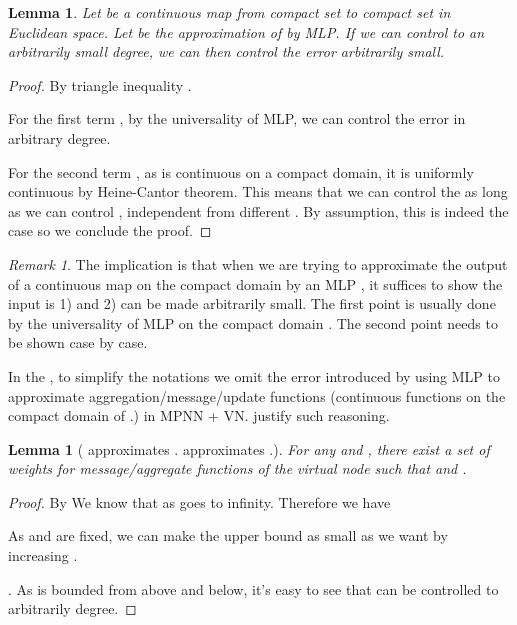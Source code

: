\documentclass[nohyperref]{article}
\theoremstyle{plain}
\newtheorem{lemma}[theorem]{Lemma}
\theoremstyle{definition}
\theoremstyle{remark}
\newtheorem{remark}[theorem]{Remark}
\begin{document}
\begin{lemma}
\label{lemma:approximation-meta-lemma}
Let  be a continuous map from compact set to compact set in Euclidean space. Let  be the approximation of  by MLP. If we can control  to an arbitrarily small degree, we can then control the error  arbitrarily small. 
\end{lemma}
\begin{proof}
By triangle inequality . 

For the first term , by the universality of MLP, we can control the error  in arbitrary degree. 

For the second term , as  is continuous on a compact domain, it is uniformly continuous by Heine-Cantor theorem. This means that we can control the  as long as we can control , independent from different . By assumption, this is indeed the case so we conclude the proof. 
\end{proof}

\begin{remark}
The implication is that when we are trying to approximate the output of a continuous map  on the compact domain by an MLP , it suffices to show the input is 1)  and 2)  can be made arbitrarily small. The first point is usually done by the universality of MLP on the compact domain \citep{cybenko1989approximation}. The second point needs to be shown case by case. 

In the , to simplify the notations we omit the error introduced by using MLP to approximate aggregation/message/update functions (continuous functions on the compact domain of .) in MPNN + VN.  justify such reasoning.  
\end{remark}


\begin{lemma}[ approximates .  approximates .]\label{lemma-approximation-node-feature}
For any  and , there exist a set of weights for message/aggregate functions of the virtual node such that  and .
\end{lemma}

\begin{proof}
By  We know that  as  goes to infinity. Therefore we have

As  and  are fixed, we can make the upper bound as small as we want by increasing .

. As  is bounded from above and below, it's easy to see that  can be controlled to arbitrarily degree. 
\end{proof}
\end{document}

